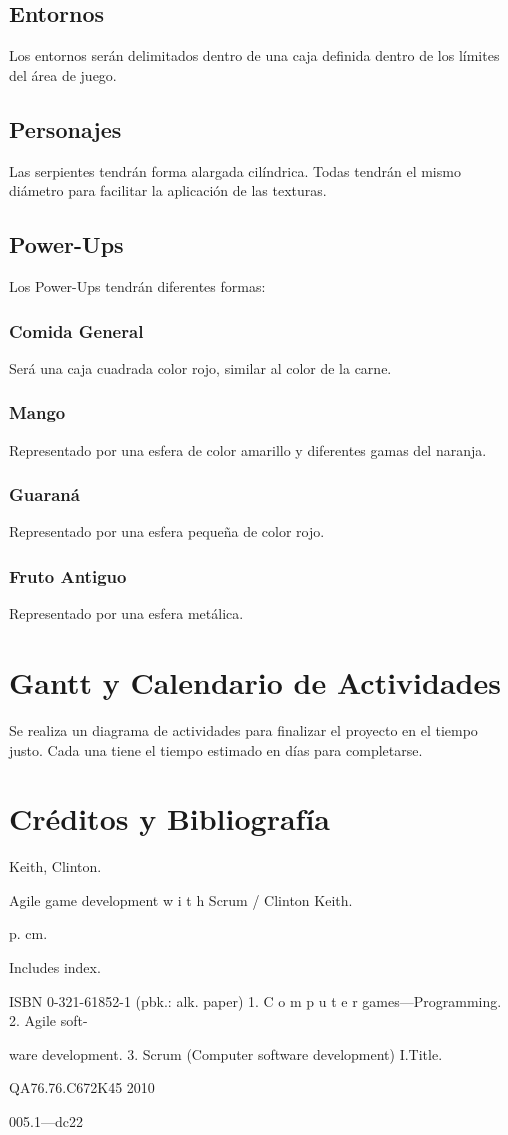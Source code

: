 \documentclass[letterpaper]{scrreprt}
\begin{document}
\section{Entornos}
Los entornos serán delimitados dentro de una caja definida dentro de los límites del área de juego.
\section{Personajes}
Las serpientes tendrán forma alargada cilíndrica. Todas tendrán el mismo diámetro para facilitar la aplicación de las texturas.
\section{Power-Ups}
Los Power-Ups tendrán diferentes formas:
\subsection{Comida General}
Será una caja cuadrada color rojo, similar al color de la carne.
\subsection{Mango}
Representado por una esfera de color amarillo y diferentes gamas del naranja.
\subsection{Guaraná}
Representado por una esfera pequeña de color rojo.
\subsection{Fruto Antiguo}
Representado por una esfera metálica.
\chapter{Gantt y Calendario de Actividades}
Se realiza un diagrama de actividades para finalizar el proyecto en el tiempo justo. Cada una tiene el tiempo estimado en días para completarse.

\chapter{Créditos y Bibliografía}


Keith, Clinton.

Agile game development w i t h Scrum / Clinton Keith.

p. cm.

Includes index.

ISBN 0-321-61852-1 (pbk.: alk. paper) 1. C o m p u t e r games—Programming. 2. Agile soft-

ware development. 3. Scrum (Computer software development) I.Title.

QA76.76.C672K45 2010

005.1—dc22



%
%
\end{document}
